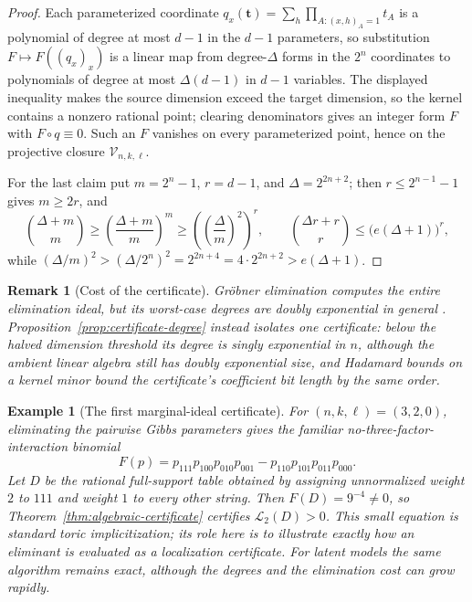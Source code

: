 \documentclass{article}
\newcommand{\LC}{\mathcal{L}}
\newtheorem{remark}{Remark}
\newtheorem{example}{Example}
\begin{document}
\begin{proof}
Each parameterized coordinate
$q_x(\mathbf t)=\sum_h\prod_{A:(x,h)_A=1}t_A$ is a polynomial of degree at
most $d-1$ in the $d-1$ parameters, so substitution
$F\mapsto F((q_x)_x)$ is a linear map from degree-$\Delta$ forms in the $2^n$
coordinates to polynomials of degree at most $\Delta(d-1)$ in $d-1$
variables.  The displayed inequality makes the source dimension exceed the
target dimension, so the kernel contains a nonzero rational point; clearing
denominators gives an integer form $F$ with $F\circ q\equiv0$.  Such an $F$
vanishes on every parameterized point, hence on the projective closure
$\mathcal V_{n,k,\ell}$.

For the last claim put $m=2^n-1$, $r=d-1$, and $\Delta=2^{2n+2}$; then
$r\le2^{n-1}-1$ gives $m\ge2r$, and
\[
  \binom{\Delta+m}{m}\ge\left(\frac{\Delta+m}{m}\right)^{m}
  \ge\left(\left(\frac{\Delta}{m}\right)^{2}\right)^{r},
  \qquad
  \binom{\Delta r+r}{r}\le\bigl(e(\Delta+1)\bigr)^{r},
\]
while
$(\Delta/m)^2>(\Delta/2^n)^2=2^{2n+4}=4\cdot2^{2n+2}>e(\Delta+1)$.
\end{proof}

\begin{remark}[Cost of the certificate]\label{rem:certificate-cost}
Gr\"obner elimination computes the entire elimination ideal, but its
worst-case degrees are doubly exponential in general \cite{mayrmeyer82}.
Proposition~\ref{prop:certificate-degree} instead isolates one certificate:
below the halved dimension threshold its degree is singly exponential in $n$,
although the ambient linear algebra still has doubly exponential size, and
Hadamard bounds on a kernel minor bound the certificate's coefficient bit
length by the same order.
\end{remark}

\begin{example}[The first marginal-ideal certificate]
For $(n,k,\ell)=(3,2,0)$, eliminating the pairwise Gibbs parameters gives the
familiar no-three-factor-interaction binomial
\[
  F(p)=p_{111}p_{100}p_{010}p_{001}
       -p_{110}p_{101}p_{011}p_{000}.
\]
Let $D$ be the rational full-support table obtained by assigning unnormalized
weight $2$ to $111$ and weight $1$ to every other string.  Then
$F(D)=9^{-4}\ne0$, so Theorem~\ref{thm:algebraic-certificate} certifies
$\LC_2(D)>0$.  This small equation is standard toric implicitization; its role
here is to illustrate exactly how an eliminant is evaluated as a localization
certificate.  For latent models the same algorithm remains exact, although
the degrees and the elimination cost can grow rapidly.
\end{example}
\end{document}
